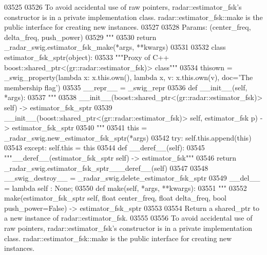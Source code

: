 \begin{DoxyCode}
{{{{{{{{{{{{{03525 \textcolor{stringliteral}{}
03526 \textcolor{stringliteral}{    To avoid accidental use of raw pointers, radar::estimator\_fsk's constructor is in a private
       implementation class. radar::estimator\_fsk::make is the public interface for creating new instances.}
03527 \textcolor{stringliteral}{}
03528 \textcolor{stringliteral}{    Params: (center\_freq, delta\_freq, push\_power)}
03529 \textcolor{stringliteral}{    """}
03530   \textcolor{keywordflow}{return} \_radar\_swig.estimator\_fsk\_make(*args, **kwargs)
03531 
03532 \textcolor{keyword}{class }estimator_fsk_sptr(object):
03533     \textcolor{stringliteral}{"""Proxy of C++ boost::shared\_ptr<(gr::radar::estimator\_fsk)> class"""}
03534     thisown = _swig_property(\textcolor{keyword}{lambda} x: x.this.own(), \textcolor{keyword}{lambda} x, v: x.this.own(v), doc=\textcolor{stringliteral}{'The membership flag'})
03535     \_\_repr\_\_ = \_swig\_repr
03536     \textcolor{keyword}{def }__init__(self, *args): 
03537         \textcolor{stringliteral}{"""}
03538 \textcolor{stringliteral}{        \_\_init\_\_(boost::shared\_ptr<(gr::radar::estimator\_fsk)> self) -> estimator\_fsk\_sptr}
03539 \textcolor{stringliteral}{        \_\_init\_\_(boost::shared\_ptr<(gr::radar::estimator\_fsk)> self, estimator\_fsk p) -> estimator\_fsk\_sptr}
03540 \textcolor{stringliteral}{        """}
03541         this = \_radar\_swig.new\_estimator\_fsk\_sptr(*args)
03542         \textcolor{keywordflow}{try}: self.this.append(this)
03543         \textcolor{keywordflow}{except}: self.this = this
03544     \textcolor{keyword}{def }__deref__(self):
03545         \textcolor{stringliteral}{"""\_\_deref\_\_(estimator\_fsk\_sptr self) -> estimator\_fsk"""}
03546         \textcolor{keywordflow}{return} \_radar\_swig.estimator\_fsk\_sptr\_\_\_deref\_\_(self)
03547 
03548     \_\_swig\_destroy\_\_ = \_radar\_swig.delete\_estimator\_fsk\_sptr
03549     \_\_del\_\_ = \textcolor{keyword}{lambda} self : \textcolor{keywordtype}{None};
03550     \textcolor{keyword}{def }make(self, *args, **kwargs):
03551         \textcolor{stringliteral}{"""}
03552 \textcolor{stringliteral}{        make(estimator\_fsk\_sptr self, float center\_freq, float delta\_freq, bool push\_power=False) ->
       estimator\_fsk\_sptr}
03553 \textcolor{stringliteral}{}
03554 \textcolor{stringliteral}{        Return a shared\_ptr to a new instance of radar::estimator\_fsk.}
03555 \textcolor{stringliteral}{}
03556 \textcolor{stringliteral}{        To avoid accidental use of raw pointers, radar::estimator\_fsk's constructor is in a private
       implementation class. radar::estimator\_fsk::make is the public interface for creating new instances.}
}}}}}}}}}}}}}
\end{DoxyCode}
